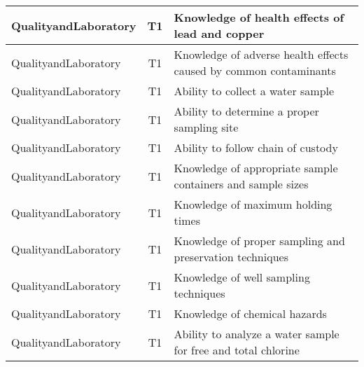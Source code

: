 \documentclass{article}
\begin{document}
\begin{table}[]
\begin{tabular}{|l|c|l|}
QualityandLaboratory                   & T1             & Knowledge of health   effects of lead and copper                                                                                  \\ \hline
QualityandLaboratory                   & T1             & Knowledge of adverse   health effects caused by common contaminants                                                               \\ \hline
QualityandLaboratory                   & T1             & Ability to collect a   water sample                                                                                               \\ \hline
QualityandLaboratory                   & T1             & Ability to determine   a proper sampling site                                                                                     \\ \hline
QualityandLaboratory                   & T1             & Ability to follow   chain of custody                                                                                              \\ \hline
QualityandLaboratory                   & T1             & Knowledge of   appropriate sample containers and sample sizes                                                                     \\ \hline
QualityandLaboratory                   & T1             & Knowledge of maximum   holding times                                                                                              \\ \hline
QualityandLaboratory                   & T1             & Knowledge of proper   sampling and preservation techniques                                                                        \\ \hline
QualityandLaboratory                   & T1             & Knowledge of well   sampling techniques                                                                                           \\ \hline
QualityandLaboratory                   & T1             & Knowledge of chemical   hazards                                                                                                   \\ \hline
QualityandLaboratory                   & T1             & Ability to analyze a   water sample for free and total chlorine                                                                   \\ \hline

\end{tabular}
\end{table}
\end{document}
